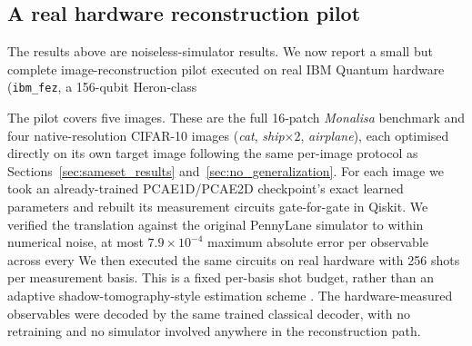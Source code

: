 \documentclass[pdflatex,sn-basic]{sn-jnl}
\DeclareRobustCommand{\blue}[1]{\leavevmode{\color{blue}#1}}
\begin{document}
\subsection{A real hardware reconstruction pilot}
\label{sec:hardware_pilot}

The results above are noiseless-simulator results. We now report a small but
complete image-reconstruction pilot executed on real IBM Quantum hardware
(\texttt{ibm\_fez}, a 156-qubit Heron-class \blue{processor).}

The pilot covers five images. These are the full 16-patch \textit{Monalisa}
benchmark and four native-resolution CIFAR-10 images (\textit{cat},
\textit{ship}$\times2$, \textit{airplane}), each optimised directly on its own
target image following the same per-image protocol as Sections~\ref{sec:sameset_results} and~\ref{sec:no_generalization}. For each image we took an already-trained PCAE1D/PCAE2D checkpoint's exact
learned parameters and rebuilt its measurement circuits gate-for-gate in Qiskit.
We verified the translation against the original PennyLane simulator to within
numerical noise, at most $7.9\times10^{-4}$ maximum absolute error per
observable across every \blue{patch.} We then executed the same circuits on real hardware with
256 shots per measurement basis. This is a fixed per-basis shot budget, rather
than an adaptive shadow-tomography-style estimation scheme
\citep{Huang2020Shadows}. The hardware-measured observables were decoded by the
same trained classical decoder, with no retraining and no simulator involved
anywhere in the reconstruction path.
\end{document}
